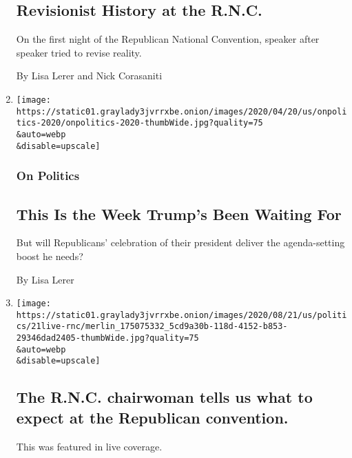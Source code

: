 \begin{enumerate}
{  \subsection{Revisionist History at the
  R.N.C.}\label{revisionist-history-at-the-rnc}}

  On the first night of the Republican National Convention, speaker
  after speaker tried to revise reality.

  By Lisa Lerer and Nick Corasaniti
\item
  \href{/2020/08/24/us/politics/trump-republicans.html}{}

  \texttt{[image: https://static01.graylady3jvrrxbe.onion/images/2020/04/20/us/onpolitics-2020/onpolitics-2020-thumbWide.jpg?quality=75\\\&auto=webp\\\&disable=upscale]}

  \hypertarget{on-politics}{%
  \subsubsection{On Politics}\label{on-politics}}

  \hypertarget{this-is-the-week-trumps-been-waiting-for}{%
  \subsection{This Is the Week Trump's Been Waiting
  For}\label{this-is-the-week-trumps-been-waiting-for}}

  But will Republicans' celebration of their president deliver the
  agenda-setting boost he needs?

  By Lisa Lerer
\item
  \href{/live/2020/08/21/us/dnc-convention-election/the-rnc-chairwoman-tells-us-what-to-expect-at-the-republican-convention}{}

  \texttt{[image: https://static01.graylady3jvrrxbe.onion/images/2020/08/21/us/politics/21live-rnc/merlin\_175075332\_5cd9a30b-118d-4152-b853-29346dad2405-thumbWide.jpg?quality=75\\\&auto=webp\\\&disable=upscale]}

  \hypertarget{the-rnc-chairwoman-tells-us-what-to-expect-at-the-republican-convention}{%
  \subsection{The R.N.C. chairwoman tells us what to expect at the
  Republican
  convention.}\label{the-rnc-chairwoman-tells-us-what-to-expect-at-the-republican-convention}}

  This was featured in live coverage.


\end{enumerate}
